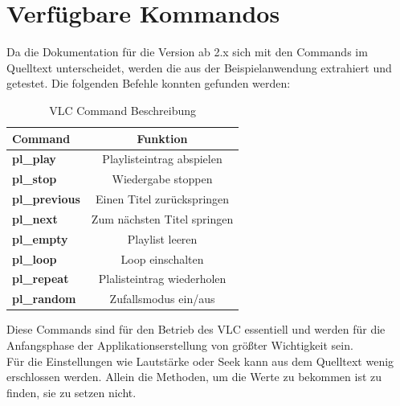 \documentclass[a4paper]{article}
\begin{document}
\section*{Verfügbare Kommandos}
Da die Dokumentation für die Version ab 2.x sich mit den Commands im Quelltext unterscheidet, werden die aus der Beispielanwendung extrahiert und getestet.
Die folgenden Befehle konnten gefunden werden:\\
\begin{table}
\caption{VLC Command Beschreibung}

\begin{center}
\begin{tabular}{|>{\bfseries}l|c|}
  \hline
  Command & Funktion\\
  \hline\hline
  pl\_play & Playlisteintrag abspielen \\
  pl\_stop & Wiedergabe stoppen \\
  pl\_previous & Einen Titel zurückspringen \\
  pl\_next & Zum nächsten Titel springen \\
  pl\_empty & Playlist leeren \\
  pl\_loop & Loop einschalten \\
  pl\_repeat & Plalisteintrag wiederholen \\
  pl\_random & Zufallsmodus ein/aus \\
  \hline
\end{tabular}
\label{tab:vlc_commands}
\end{center}
\end{table}

Diese Commands sind für den Betrieb des VLC essentiell und werden für die Anfangsphase der Applikationserstellung von größter Wichtigkeit sein. \\
Für die Einstellungen wie Lautstärke oder Seek kann aus dem Quelltext wenig erschlossen werden. Allein die Methoden, um die Werte zu bekommen ist zu finden, sie zu setzen nicht.



\newpage
\nocite{*}
\printbibliography

\listoffigures
\lstlistoflistings
\listoftables
\end{document}
